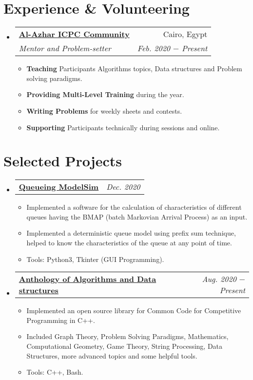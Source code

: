 \documentclass[letterpaper, 11pt]{article}
\makeatletter
\newcommand{\experienceItem}[4] {
  \vspace{-1pt}\item
  \begin{tabular*}{0.97\textwidth}[t]{l@{\extracolsep{\fill}}r}
    \textbf{#1} & #2 \\
    \textit{\small #3} & \textit{\small #4} \\
  \end{tabular*}\vspace{-5pt}
}
\newcommand{\experienceSubItem}[2] {\item\small{\textbf{#1}{#2 \vspace{-2pt}}}}
\newcommand{\projectItem}[2] {
  \vspace{-1pt}\item
  \begin{tabular*}{0.97\textwidth}[t]{l@{\extracolsep{\fill}}r}
    \textbf{#1} & \textit{\small #2} \\
  \end{tabular*}\vspace{-5pt}
}
\newcommand{\projectSubItem}[1] {\item\small{#1 \vspace{-2pt}}}
\makeatother
\begin{document}
\section{Experience \& Volunteering}
\begin{itemize}[leftmargin=*]
  \experienceItem{\href{https://sites.google.com/view/azharicpc/home}{Al-Azhar ICPC Community}}{Cairo, Egypt}{Mentor and Problem-setter}{Feb. 2020 $-$ Present}
  \begin{itemize}
    \experienceSubItem{Teaching}{ Participants Algorithms topics, Data structures and Problem solving paradigms.}
    \experienceSubItem{Providing Multi-Level Training}{ during the year.}
    \experienceSubItem{Writing Problems}{ for weekly sheets and contests.}
    \experienceSubItem{Supporting}{ Participants technically during sessions and online.}
  \end{itemize}\vspace{-5pt}
\end{itemize}

\section{Selected Projects}
\begin{itemize}[leftmargin=*]
  \projectItem{\faIcon{user-clock} \href{https://github.com/AbdeltwabMF/Queueing-ModelSim}{Queueing ModelSim}}{Dec. 2020}
  \begin{itemize}
    \projectSubItem{Implemented a software for the calculation of characteristics of different queues having the BMAP (batch Markovian Arrival Process) as an input.}
    \projectSubItem{Implemented a deterministic queue model using prefix sum technique, helped to know the characteristics of the queue at any point of time.}
    \projectSubItem{Tools: Python3, Tkinter (GUI Programming).}
  \end{itemize}\vspace{-5pt}

  \projectItem{\faIcon{laptop-code} \href{https://github.com/AbdeltwabMF/Anthology-of-Algorithms-and-Data-structures}{Anthology of Algorithms and Data structures}}{Aug. 2020 $-$ Present}
  \begin{itemize} 
    \projectSubItem{Implemented an open source library for Common Code for Competitive Programming in C++.}
    \projectSubItem{Included Graph Theory, Problem Solving Paradigms, Mathematics, Computational Geometry, Game Theory, String Processing, Data Structures, more advanced topics and some helpful tools.}
    \projectSubItem{Tools: C++, Bash.}
  \end{itemize}\vspace{-5pt}
\end{itemize}
\end{document}
